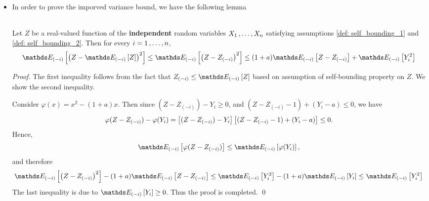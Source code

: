 \documentclass[11pt]{article}
\begin{document}
\begin{itemize}
\item In order to prove the imporved variance bound, we have the following lemma
\begin{lemma}\citep{boucheron2013concentration}\\
Let $Z$ be a real-valued function of the \textbf{independent} random variables $X_1 \,{,}\ldots{,}\, X_n$ satisfying assumptions \eqref{def: self_bounding_1} and \eqref{def: self_bounding_2}. Then for every $i = 1 \,{,}\ldots{,}\, n$,
\begin{align}
\E{(-i)}{\paren{Z- \E{(-i)}{Z}}^2} \le \E{(-i)}{\paren{Z - Z_{(-i)}}^2} \le (1 + a) \E{(-i)}{Z - Z_{(-i)}} + \E{(-i)}{Y_i^2} \label{lemma: variance_bound_inequality}
\end{align}
\end{lemma}
\begin{proof}
The first inequality follows from the fact that $Z_{(-i)} \le \E{(-i)}{Z}$ based on assumption of self-bounding property on $Z$. We show the second inequality.

Consider $\varphi(x) = x^2 - (1+a)x$. Then since $(Z - Z_{(-i)}) - Y_i  \ge 0$, and $(Z - Z_{(-i)} - 1) + (Y_i - a) \le 0$, we have
\begin{align*}
\varphi(Z - Z_{(-i)}) - \varphi(Y_i) = \left[(Z - Z_{(-i)}) - Y_i\right]\left[(Z - Z_{(-i)} - 1) + (Y_i - a)\right] \le 0.
\end{align*} Hence,
\begin{align*}
\E{(-i)}{\varphi(Z - Z_{(-i)})} \le \E{(-i)}{\varphi(Y_i)},
\end{align*} and therefore
\begin{align*}
\E{(-i)}{\paren{Z - Z_{(-i)}}^2} - (1 + a) \E{(-i)}{Z - Z_{(-i)}} \le \E{(-i)}{Y_i^2} - (1+a)\E{(-i)}{Y_i} \le \E{(-i)}{Y_i^2} 
\end{align*} The last inequality is due to $\E{(-i)}{Y_i} \ge  0$. Thus the proof  is completed. \qed
\end{proof}


\end{itemize}
\end{document}
